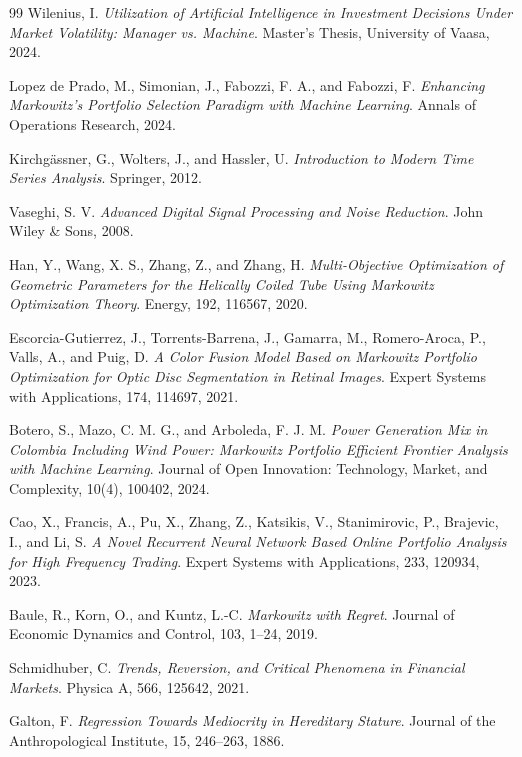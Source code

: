 \documentclass[preprint,12pt]{elsarticle}
\theoremstyle{plain}
\theoremstyle{definition}
\begin{document}
\begin{thebibliography}{99}
Wilenius, I.  
\textit{Utilization of Artificial Intelligence in Investment Decisions Under Market Volatility: Manager vs. Machine}.  
Master's Thesis, University of Vaasa, 2024.

Lopez de Prado, M., Simonian, J., Fabozzi, F. A., and Fabozzi, F.  
\textit{Enhancing Markowitz's Portfolio Selection Paradigm with Machine Learning}.  
Annals of Operations Research, 2024.

Kirchgässner, G., Wolters, J., and Hassler, U.  
\textit{Introduction to Modern Time Series Analysis}.  
Springer, 2012.

Vaseghi, S. V.  
\textit{Advanced Digital Signal Processing and Noise Reduction}.  
John Wiley \& Sons, 2008.

Han, Y., Wang, X. S., Zhang, Z., and Zhang, H.  
\textit{Multi-Objective Optimization of Geometric Parameters for the Helically Coiled Tube Using Markowitz Optimization Theory}.  
Energy, 192, 116567, 2020.

Escorcia-Gutierrez, J., Torrents-Barrena, J., Gamarra, M., Romero-Aroca, P., Valls, A., and Puig, D.  
\textit{A Color Fusion Model Based on Markowitz Portfolio Optimization for Optic Disc Segmentation in Retinal Images}.  
Expert Systems with Applications, 174, 114697, 2021.

Botero, S., Mazo, C. M. G., and Arboleda, F. J. M.  
\textit{Power Generation Mix in Colombia Including Wind Power: Markowitz Portfolio Efficient Frontier Analysis with Machine Learning}.  
Journal of Open Innovation: Technology, Market, and Complexity, 10(4), 100402, 2024.

Cao, X., Francis, A., Pu, X., Zhang, Z., Katsikis, V., Stanimirovic, P., Brajevic, I., and Li, S.  
\textit{A Novel Recurrent Neural Network Based Online Portfolio Analysis for High Frequency Trading}.  
Expert Systems with Applications, 233, 120934, 2023.

Baule, R., Korn, O., and Kuntz, L.-C.  
\textit{Markowitz with Regret}.  
Journal of Economic Dynamics and Control, 103, 1--24, 2019.

Schmidhuber, C.  
\textit{Trends, Reversion, and Critical Phenomena in Financial Markets}.  
Physica A, 566, 125642, 2021.

Galton, F.  
\textit{Regression Towards Mediocrity in Hereditary Stature}.  
Journal of the Anthropological Institute, 15, 246--263, 1886.


\end{thebibliography}
\end{document}
